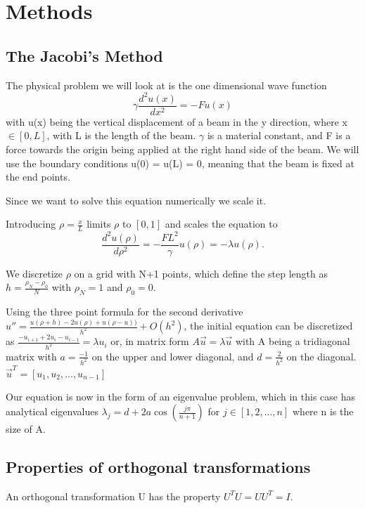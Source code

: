 \section{Methods}

\subsection*{The Jacobi's Method}

The physical problem we will look at is the one dimensional wave function
\begin{equation}
\gamma \frac{d^2 u(x)}{dx^2} = -F u(x)
\end{equation}
with u(x) being the vertical displacement of a beam in the y direction, where
x $\in [0, L]$, with L is the length of the beam. $\gamma$ is a material constant,
and F is a force towards the origin being applied at the right hand side of the beam.
We will use the boundary conditions u(0) = u(L) = 0, meaning that the beam is
fixed at the end points.


Since we want to solve this equation numerically we scale it.

Introducing $ \rho = \frac{x}{L} $ limits $\rho$ to $[0, 1]$ and scales the
equation to
$$\frac{d^2 u(\rho)}{d\rho^2} = - \frac{FL^2}{\gamma} u(\rho) = -\lambda u(\rho).$$

We discretize $\rho$ on a grid with N+1 points, which
define the step length as $h = \frac{\rho_N - \rho_0}{N}$ with $\rho_N = 1$ and
$\rho_0 = 0$.

Using the three point formula for the second derivative $ u'' = \frac{u(\rho + h) - 2u(\rho) +
u(\rho -u))}{h^2} + O(h^2)$, the initial equation can be discretized as
$\frac{-u_{i+1} + 2u_i - u_{i-1}}{h^2} = \lambda u_i$
or, in matrix form
$ A \vec{u} = \lambda \vec{u}$
with A being a tridiagonal matrix with $a = \frac{-1}{h^2}$ on the upper and lower
diagonal, and $d = \frac{2}{h^2}$ on the diagonal. $\vec{u}^T = [u_1, u_2, ..., u_{n-1}]$

Our equation is now in the form of an eigenvalue problem, which in this case has
analytical eigenvalues $\lambda_j = d + 2a\cos{(\frac{j\pi}{n+1})}$ for $j \in
[1,2,...,n]$ where n is the size of A. \cite{lectures}

\subsection{Properties of orthogonal transformations}

An orthogonal transformation U has the property $U^T U = U U^T = I$.

